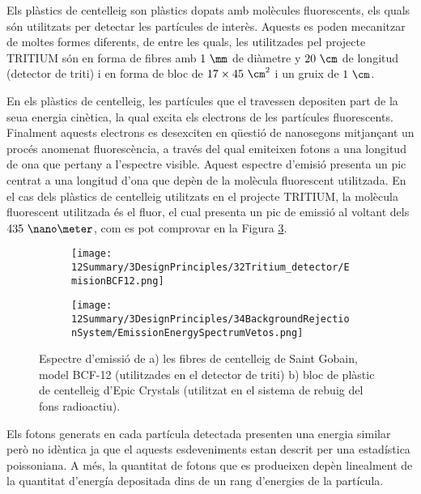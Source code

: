 Els plàstics de centelleig son plàstics dopats amb molècules fluorescents, els quals són utilitzats per detectar les partícules de interès. Aquests es poden mecanitzar de moltes formes diferents, de entre les quals, les utilitzades pel projecte TRITIUM són en forma de fibres amb $1~\mm$ de diàmetre y $20~\cm$ de longitud (detector de triti) i en forma de bloc de $17\times45~\cm^2$ i un gruix de $1~\cm$. 

En els plàstics de centelleig, les partícules que el travessen depositen part de la seua energia cinètica, la qual excita els electrons de les partícules fluorescents. Finalment aquests electrons es desexciten en qüestió de nanosegons mitjançant un procés anomenat fluorescència, a través del qual emiteixen fotons a una longitud de ona que pertany a l'espectre visible. Aquest espectre d'emisió presenta un pic centrat a una longitud d'ona que depèn de la molècula fluorescent utilitzada. En el cas dels plàstics de centelleig utilitzats en el projecte TRITIUM, la molècula fluorescent utilitzada és el fluor, el cual presenta un pic de emissió al voltant dels $435~\nano\meter$, com es pot comprovar en la Figura \ref{fig:EspectreEmisioPlasticsTRITIUM}.

\begin{figure}
\centering
    \begin{subfigure}[b]{0.7\textwidth}
    \centering
    \texttt{[image: 12Summary/3DesignPrinciples/32Tritium\_detector/EmisionBCF12.png]}  
        \caption{}\label{subfig:EspectreEmisioFibres}
    \end{subfigure}
    \hfill
    \begin{subfigure}[b]{0.7\textwidth}
    \centering
    \texttt{[image: 12Summary/3DesignPrinciples/34BackgroundRejectionSystem/EmissionEnergySpectrumVetos.png]}  
    \caption{\label{subfig:EspectreEmisioVeto}}
    \end{subfigure}
\caption{Espectre d'emissió de a) les fibres de centelleig de Saint Gobain, model BCF-12 (utilitzades en el detector de triti) \cite{DataSheetBCF12Fiber} b) bloc de plàstic de centelleig d'Epic Crystals (utilitzat en el sistema de rebuig del fons radioactiu)\cite{ScintillatorVeto}\label{fig:EspectreEmisioPlasticsTRITIUM}.}
\end{figure}

Els fotons generats en cada partícula detectada presenten una energia similar però no idèntica ja que el aquests esdeveniments estan descrit per una estadística poissoniana. A més, la quantitat de fotons que es produeixen depèn linealment de la quantitat d'energía depositada dins de un rang d'energies de la partícula.


